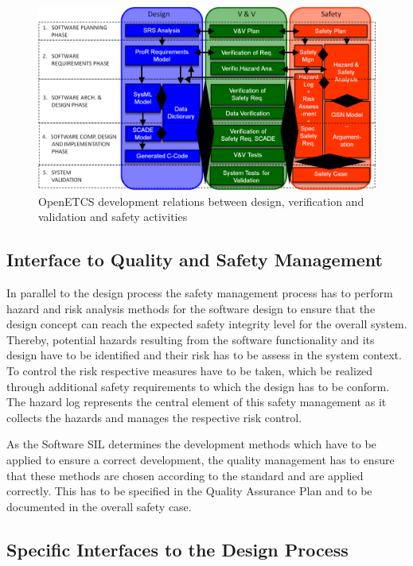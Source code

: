 \documentclass{template/openetcs_report}
\begin{document}
\begin{figure}[htbp]
\centering
\includegraphics[width=1\linewidth]{./images/openETCS-Software-Safety-Development}
\caption{OpenETCS development relations between design, verification and validation and safety activities}
\label{fig:SafetyProcess}
\end{figure}


\subsection{Interface to Quality and Safety Management}

In parallel to the design process the safety management process has to perform hazard and risk analysis methods for the software design to ensure that the design concept can reach the expected safety integrity level for the overall system. Thereby, potential hazards resulting from the software functionality and its design have to be identified and their risk has to be assess in the system context. To control the risk respective measures have to be taken, which be realized through additional safety requirements to which the design has to be conform. The hazard log represents the central element of this safety management as it collects the hazards and manages the respective risk control.

As the Software SIL determines the development methods which have to be applied to ensure a correct development, the quality management has to ensure that these methods are chosen according to the standard and are applied correctly. This has to be specified in the Quality Assurance Plan and to be documented in the overall safety case. 

\subsection{Specific Interfaces to the Design Process}
\end{document}

